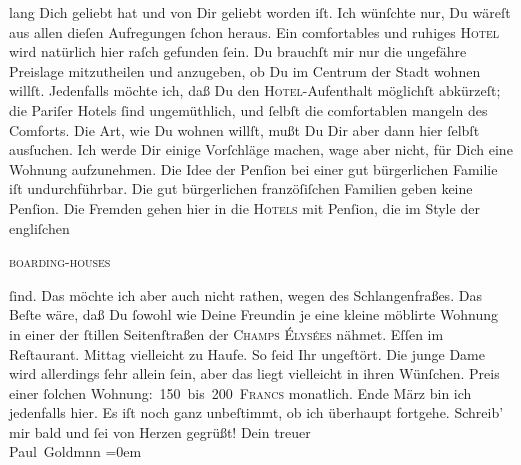 \begin{ledgroupsized}[t]{13cm}
               lang Dich geliebt hat und von Dir geliebt worden iſt. {\pb}Ich wünſchte nur, Du wäreſt aus allen dieſen
               Aufregungen ſchon heraus.\pend
           \pstart
           Ein comfortables und ruhiges \textsc{Hotel} wird natürlich hier  raſch gefunden ſein. Du brauchſt mir nur die
               ungefähre  Preislage mitzutheilen und anzugeben,
               ob Du im Centrum der Stadt
               wohnen willſt. Jedenfalls möchte ich, daß Du den \textsc{Hotel}-Aufenthalt möglichſt abkürzeſt; die Pariſer Hotels ſind ungemüthlich, und ſelbſt die comfortablen mangeln des
               Comforts. Die Art, wie Du wohnen willſt, mußt Du Dir aber dann hier ſelbſt ausſuchen.
               Ich werde Dir einige Vorſchläge machen, wage aber nicht, für Dich {\pb}eine Wohnung aufzunehmen. Die Idee der Penſion bei
               einer gut bürgerlichen Familie iſt undurchführbar. Die gut bürgerlichen franzöſiſchen Familien geben
               keine Penſion. Die Fremden gehen hier in die \textsc{Hotels} mit
               Penſion, die im Style der engliſchen{ }\begin{otherlanguage}{english}\textsc{boarding-houses}\end{otherlanguage}{ }ſind. Das möchte ich aber auch nicht rathen, wegen
               des Schlangenfraßes. Das Beſte wäre, daß Du ſowohl wie Deine Freundin je eine kleine möblirte Wohnung in
               einer der ſtillen Seitenſtraßen der \textsc{Champs Élysées} nähmet. Eſſen im Reſtaurant. \strikeout{\textcolor{gray}{×}} Mittag vielleicht zu Haufe. {\pb}So ſeid Ihr
               ungeſtört. Die junge Dame
               wird allerdings ſehr allein ſein, aber das liegt vielleicht in ihren Wünſchen. Preis
               einer ſolchen Wohnung: 150 bis 200 \textsc{Francs} monatlich.\pend
           \pstart
            Ende März bin ich jedenfalls hier. Es iſt noch
               ganz unbeſtimmt, ob ich überhaupt fortgehe.\pend
           \pstart
           Schreib’ mir bald und ſei von Herzen gegrüßt!\pend
           \pstart
           Dein treuer {\\[\baselineskip]}\spacefill\mbox{Paul Goldmnn}\pend
           \leftskip=0em{}
         
         \endnumbering{}\end{ledgroupsized}  \newcommand{\dateiname}{L02804}\newcommand{\titel}{Paul Goldmann an Arthur Schnitzler, 24. 2. [1897]}\newcommand{\editorInnen}{Martin Anton Müller und Laura Untner}
      